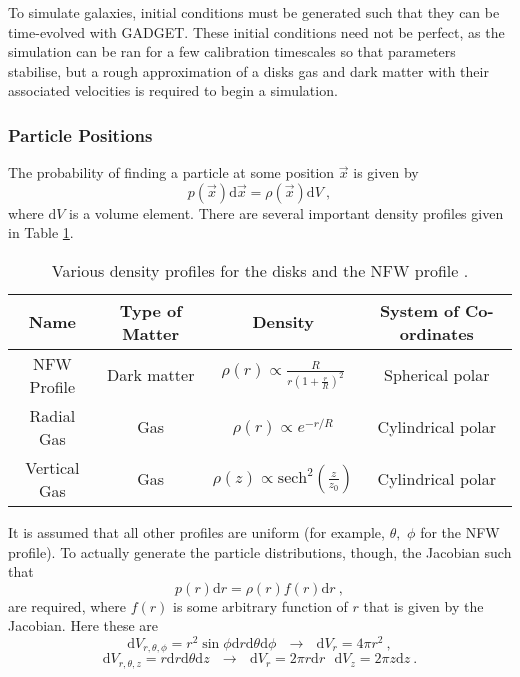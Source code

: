 To simulate galaxies, initial conditions must be generated such that they
can be time-evolved with GADGET. These initial conditions need not be
perfect, as the simulation can be ran for a few calibration timescales
so that parameters stabilise, but a rough approximation
of a disks gas and dark matter with their associated velocities is required to
begin a simulation.

\subsubsection{Particle Positions}

The probability of finding a particle at some position \(\vec{x}\) is
given by
\[
    p(\vec{x})\mathrm{d}\vec{x} = \rho(\vec{x})\mathrm{d}V~,
\]
where \(\mathrm{d}V\) is a volume element. There are several important
density profiles given in Table \ref{tab:profiles}.

\begin{table}
\centering
\begin{tabular}{c|c|c|c}
Name   &  Type of Matter  &    Density               & System of Co-ordinates \\ \hline
NFW Profile & Dark matter & $\rho(r) \propto \frac{R}{r\left(1 + \frac{r}{R}\right)^2}$ & Spherical polar \\
Radial Gas  & Gas & $\rho(r) \propto e^{-r/R}$ & Cylindrical polar \\
Vertical Gas & Gas & $\rho(z) \propto \mathrm{sech}^2\left(\frac{z}{z_0}\right)$ & Cylindrical polar \\
\end{tabular}
\caption{Various density profiles for the disks and the NFW profile \citep{ferriere_interstellar_2001, coe_dark_2010}.}
\label{tab:profiles}
\end{table}

It is assumed that all other profiles are uniform (for example,
\(\theta,\) \(\phi\) for the NFW profile). To actually generate the
particle distributions, though, the Jacobian such that
\[
    p(r)\mathrm{d}r = \rho(r) f(r) \mathrm{d}r~,
\]
are required, where \(f(r)\) is some arbitrary function of \(r\) that is given by the
Jacobian. Here these are
\[
    \mathrm{d}V_{r, \theta, \phi} = r^2\sin\phi\mathrm{d}r\mathrm{d}\theta\mathrm{d}\phi ~ ~ ~ \rightarrow ~ ~ ~ \mathrm{d}V_{r} = 4\pi r^2~,
\] \[
    \mathrm{d}V_{r, \theta, z} = r\mathrm{d}r\mathrm{d}\theta\mathrm{d}z ~ ~ ~ \rightarrow ~ ~ ~ \mathrm{d}V_{r} = 2\pi r \mathrm{d}r ~ ~ ~ \mathrm{d}V_z = 2\pi z \mathrm{d}z~.
\]


